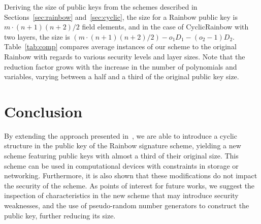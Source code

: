 \documentclass[a4paper, 14pt]{extarticle}
\begin{document}
Deriving the size of public keys from the schemes described in Sections~\ref{sec:rainbow} and~\ref{sec:cyclic}, the size for a Rainbow public key is $m \cdot (n + 1)(n + 2)/2$ field elements, and in the case of CyclicRainbow with two layers, the size is $(m \cdot (n + 1)(n + 2)/2) - o_{1} D_{1} - (o_{2} - 1) D_{2}$. Table~\ref{tab:comp} compares average instances of our scheme to the original Rainbow with regards to various security levels and layer sizes. Note that the reduction factor grows with the increase in the number of polynomials and variables, varying between a half and a third of the original public key size.

\section{Conclusion}\label{sec:conclusion}

By extending the approach presented in~\cite{Petzoldt:inproc:2010:jun}, we are able to introduce a cyclic structure in the public key of the Rainbow signature scheme, yielding a new scheme featuring public keys with almost a third of their original size. This scheme can be used in computational devices with constraints in storage or networking. Furthermore, it is also shown that these modifications do not impact the security of the scheme. As points of interest for future works, we suggest the inspection of characteristics in the new scheme that may introduce security weaknesses, and the use of pseudo-random number generators to construct the public key, further reducing its size.


{\small
}
\end{document}
